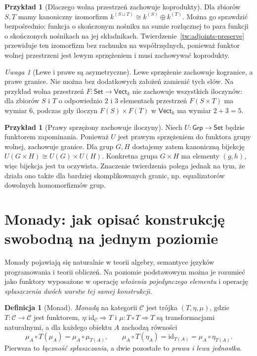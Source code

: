 \documentclass[11pt,a4paper]{article}
\numberwithin{equation}{section}
\theoremstyle{plain}
\theoremstyle{definition}
\newtheorem{definicja}[twierdzenie]{Definicja}
\newtheorem{przyklad}[twierdzenie]{Przykład}
\theoremstyle{remark}
\newtheorem{uwaga}[twierdzenie]{Uwaga}
\newcommand{\cat}[1]{\mathsf{#1}}
\newcommand{\Set}{\cat{Set}}
\newcommand{\Grp}{\cat{Grp}}
\newcommand{\Vect}{\cat{Vect}}
\newcommand{\id}{\mathrm{id}}
\begin{document}
\begin{przyklad}[Dlaczego wolna przestrzeń zachowuje koprodukty]
Dla zbiorów $S,T$ mamy kanoniczny izomorfizm $k^{(S\sqcup T)}\cong k^{(S)}\oplus k^{(T)}$. Można go sprawdzić bezpośrednio: funkcja o skończonym nośniku na sumie rozłącznej to para funkcji o skończonych nośnikach na jej składnikach. Twierdzenie~\ref{tw:adjoints-preserve} przewiduje ten izomorfizm bez rachunku na współrzędnych, ponieważ funktor wolnej przestrzeni jest lewym sprzężeniem i musi zachowywać koprodukty.
\end{przyklad}

\begin{uwaga}[Lewe i prawe są asymetryczne]
Lewe sprzężenie zachowuje kogranice, a prawe granice. Nie można bez dodatkowych założeń zamienić tych słów. Na przykład wolna przestrzeń $F:\Set\to\Vect_k$ nie zachowuje wszystkich iloczynów: dla zbiorów $S$ i $T$ o odpowiednio $2$ i $3$ elementach przestrzeń $F(S\times T)$ ma wymiar $6$, podczas gdy iloczyn $F(S)\times F(T)$ w $\Vect_k$ ma wymiar $2+3=5$.
\end{uwaga}


\begin{przyklad}[Prawy sprzężony zachowuje iloczyny]
Niech $U:\Grp\to\Set$ będzie funktorem zapominania. Ponieważ $U$ jest prawym sprzężeniem do funktora grupy wolnej, zachowuje granice. Dla grup $G,H$ dostajemy zatem kanoniczną bijekcję $U(G\times H)\cong U(G)\times U(H)$. Konkretna grupa $G\times H$ ma elementy $(g,h)$, więc bijekcja jest tu oczywista. Znaczenie twierdzenia polega jednak na tym, że działa ono także dla bardziej skomplikowanych granic, np. equalizatorów dowolnych homomorfizmów grup.
\end{przyklad}


\section{Monady: jak opisać konstrukcję swobodną na jednym poziomie}\label{sec:monads}

Monady pojawiają się naturalnie w teorii algebry, semantyce języków programowania i teorii obliczeń. Na poziomie podstawowym można je rozumieć jako funktory wyposażone w operację \emph{włożenia pojedynczego elementu} i operację \emph{spłaszczenia dwóch warstw tej samej konstrukcji}.

\begin{definicja}[Monad]\label{def:monad}
\emph{Monadą} na kategorii $\mathcal C$ jest trójka $(T,\eta,\mu)$, gdzie $T:\mathcal C\to\mathcal C$ jest funktorem, $\eta:\id_{\mathcal C}\Rightarrow T$ i $\mu:T\circ T\Rightarrow T$ są transformacjami naturalnymi, a dla każdego obiektu $A$ zachodzą równości
\[
\mu_A\circ T(\mu_A)=\mu_A\circ\mu_{T(A)},\qquad\mu_A\circ T(\eta_A)=\id_{T(A)}=\mu_A\circ\eta_{T(A)}.
\]
Pierwsza to \emph{łączność spłaszczania}, a dwie pozostałe to \emph{prawa i lewa jednostka}.
\end{definicja}
\end{document}
